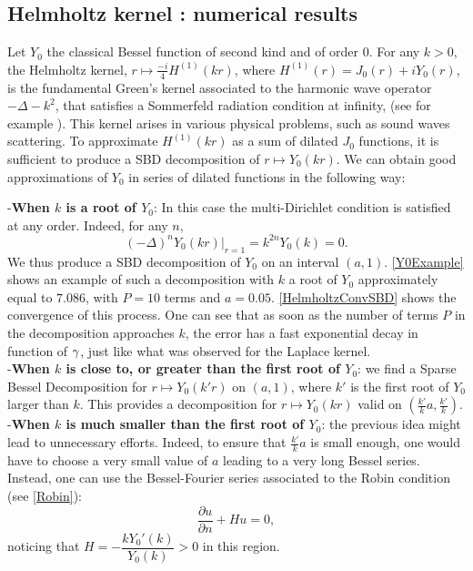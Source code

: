 \documentclass[smallextended]{svjour3}
\begin{document}
																														
\subsection{Helmholtz kernel : numerical results}
\label{HelmoholtzSubSection}
Let $Y_0$ the classical Bessel function of second kind and of order $0$. For any $k>0$, the Helmholtz kernel, $r \mapsto \frac{-i}{4}H^{(1)}(kr)$, where $H^{(1)}(r) = J_0(r) + i Y_0(r)$, is the fundamental Green's kernel associated to the harmonic wave operator $- \Delta - k^2$, that satisfies a Sommerfeld radiation condition at infinity, (see for example  \cite{wilcox1975scattering}). This kernel arises in various physical problems, such as sound waves scattering. To approximate $H^{(1)}(kr)$ as a sum of dilated $J_0$ functions, it is sufficient to produce a SBD decomposition of $r \mapsto Y_0(kr)$. We can obtain good approximations of $Y_0$ in series of dilated functions in the following way:

\noindent-\textbf{When $k$ is a root of $Y_0$}:
In this case the multi-Dirichlet condition is satisfied at any order. Indeed, for any $n$, 
\[(-\Delta)^n Y_0(kr)\big|_{r=1} = k^{2n} Y_0(k) = 0.\]
We thus produce a SBD decomposition of $Y_0$ on an interval $(a,1)$. \autoref{Y0Example} shows an example of such a decomposition with $k$ a root of $Y_0$ approximately equal to $7.086$, with $P=10$ terms and $a=0.05$. \autoref{HelmholtzConvSBD} shows the convergence of this process. One can see that as soon as the number of terms $P$ in the decomposition approaches $k$, the error has a fast exponential decay in function of $\gamma$, just like what was observed for the Laplace kernel. \\
-\textbf{When $k$ is close to, or greater than the first root of $Y_0$}: we find a Sparse Bessel Decomposition for $r \mapsto Y_0(k'r)$ on $(a,1)$, where $k'$ is the first root of $Y_0$ larger than $k$. This provides a decomposition for $r \mapsto Y_0(kr)$ valid on $(\frac{k'}{k}a,\frac{k'}{k})$. \\
-\textbf{When $k$ is much smaller than the first root of $Y_0$}: the previous idea might lead to unnecessary efforts. Indeed, to ensure that $\frac{k'}{k}a$ is small enough, one would have to choose a very small value of $a$ leading to a very long Bessel series. Instead, one can use the Bessel-Fourier series associated to the Robin condition (see \autoref{Robin}):
\[\dfrac{\partial u}{\partial n} + H u = 0,\]
noticing that $H = -\dfrac{k Y_0'(k)}{Y_0(k)} > 0$ in this region. 
\end{document}

